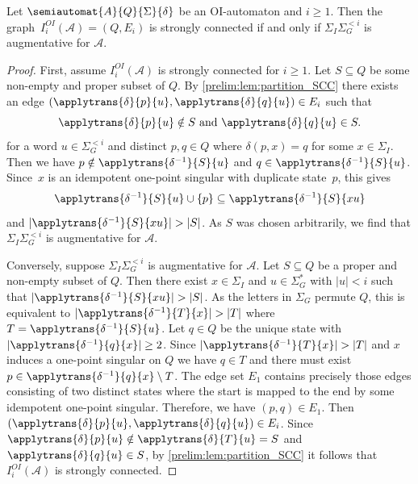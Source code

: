 \begin{theorem}\label{thm:ISCCaugmentative}
	Let $\semiautomat{A}{Q}{\Sigma}{\delta}$
	be an OI-automaton and $i \ge 1$.
	Then the graph~$I_i^{OI}(\mathcal A) = (Q, E_i)$ 
	is strongly connected if and only if $\Sigma_I \Sigma_G^{< i}$
	is augmentative for $\mathcal A$. 
\end{theorem}
\begin{proof}
	First, assume $I_i^{OI}(\mathcal A)$ is strongly connected for $i \ge 1$.
	Let $S \subseteq Q$ be some non-empty and proper subset of $Q$.	
	By \cref{prelim:lem:partition_SCC}
	there exists an edge $(\applytrans{\delta}{p}{u},\applytrans{\delta}{q}{u}) \in E_i$	
	such that
	\[
	\applytrans{\delta}{p}{u} \notin S \text{ and } \applytrans{\delta}{q}{u} \in S.
	\]
	for a word $u \in \Sigma_G^{< i}$ and distinct $p, q \in Q$
	where $\delta(p, x) = q$ for some $x \in \Sigma_I$.
	Then we have $p \notin \applytrans{\delta^{-1}}{S}{u}$
	and $q \in \applytrans{\delta^{-1}}{S}{u}$. Since~$x$ is an idempotent one-point singular with duplicate 
	state~$p$, this gives
	\[
	\applytrans{\delta^{-1}}{S}{u} \cup \{p\} \subseteq \applytrans{\delta^{-1}}{S}{xu}
	\]
	and $|\applytrans{\delta^{-1}}{S}{xu}| > |S|$.
	As $S$ was chosen arbitrarily, 	
	we find that $\Sigma_I \Sigma_G^{< i}$
	is augmentative for $\mathcal A$.	
	
	Conversely, suppose $\Sigma_I \Sigma_G^{< i}$
	is augmentative for $\mathcal A$.
	Let $S \subseteq Q$ be a proper and non-empty subset of $Q$.
	Then there exist $x \in \Sigma_I$
	and $u \in \Sigma_G^*$ with $|u| < i$
	such that $|\applytrans{\delta^{-1}}{S}{xu}| > |S|$.
	As the letters in $\Sigma_G$ permute $Q$,
	this is equivalent
	to $|\applytrans{\delta^{-1}}{T}{x}| > |T|$
	where $T = \applytrans{\delta^{-1}}{S}{u}$.
	Let $q \in Q$
	be the unique state with $|\applytrans{\delta^{-1}}{q}{x}| \ge 2$.
	Since $|\applytrans{\delta^{-1}}{T}{x}| > |T|$
	and $x$ induces a one-point singular on $Q$
	we have $q \in T$
	and there must exist $p \in \applytrans{\delta^{-1}}{q}{x} \setminus T$.
	The edge set $E_1$ contains precisely those edges 
	consisting of two distinct states where the start is mapped to the end by some idempotent one-point singular.
	Therefore, we have $(p,q) \in E_1$.
	Then $(\applytrans{\delta}{p}{u}, \applytrans{\delta}{q}{u}) \in E_i$.
	Since $\applytrans{\delta}{p}{u} \notin \applytrans{\delta}{T}{u} = S$
	and $\applytrans{\delta}{q}{u} \in S$,
	by \cref{prelim:lem:partition_SCC} it follows that $I_i^{OI}(\mathcal A)$ is strongly connected.
\end{proof}

